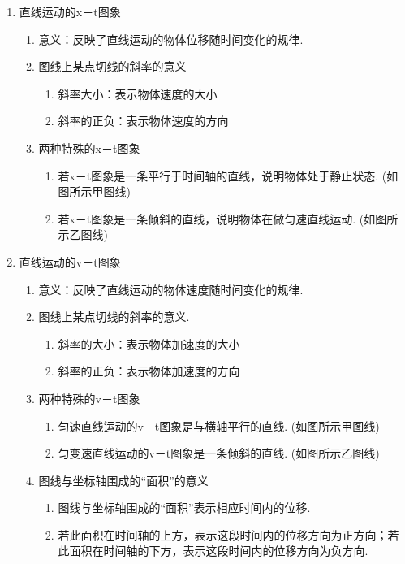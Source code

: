 \documentclass[cn,11pt]{elegantbook}
\begin{document}
   \begin{enumerate}
      \item 直线运动的x－t图象
      \begin{enumerate}
         \item 意义：反映了直线运动的物体位移随时间变化的规律.
         \item 图线上某点切线的斜率的意义
         \begin{enumerate}
            \item 斜率大小：表示物体速度的大小
            \item 斜率的正负：表示物体速度的方向
         \end{enumerate}
         \item 两种特殊的x－t图象
         \begin{enumerate}
            \item 若x－t图象是一条平行于时间轴的直线，说明物体处于静止状态. (如图所示甲图线)
            \item 若x－t图象是一条倾斜的直线，说明物体在做匀速直线运动. (如图所示乙图线)
         \end{enumerate}
      \end{enumerate}
      \item 直线运动的v－t图象
      \begin{enumerate}
         \item 意义：反映了直线运动的物体速度随时间变化的规律.
         \item 图线上某点切线的斜率的意义.
         \begin{enumerate}
            \item 斜率的大小：表示物体加速度的大小
            \item 斜率的正负：表示物体加速度的方向
         \end{enumerate}
         \item 两种特殊的v－t图象
         \begin{enumerate}
            \item 匀速直线运动的v－t图象是与横轴平行的直线. (如图所示甲图线)
            \item 匀变速直线运动的v－t图象是一条倾斜的直线. (如图所示乙图线)
         \end{enumerate}
         \item 图线与坐标轴围成的“面积”的意义
         \begin{enumerate}
            \item 图线与坐标轴围成的“面积”表示相应时间内的位移.
            \item 若此面积在时间轴的上方，表示这段时间内的位移方向为正方向；若此面积在时间轴的下方，表示这段时间内的位移方向为负方向.

\end{enumerate}
\end{enumerate}
\end{enumerate}
\end{document}
